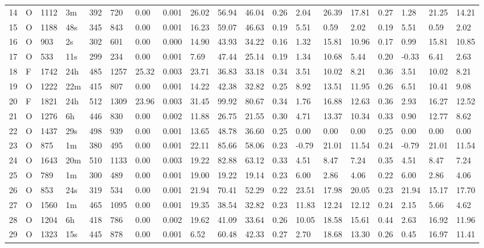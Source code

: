 \begin{tabular}{rllllllrlllllllllll}
14 & O & 1112 & 3m & 392 & 720 & 0.00 & 0.001 & 26.02 & 56.94 & 46.04 & 0.26 & 2.04 & 26.39 & 17.81 & 0.27 & 1.28 & 21.25 & 14.21 \\
15 & O & 1188 & 48s & 345 & 843 & 0.00 & 0.001 & 16.23 & 59.07 & 46.63 & 0.19 & 5.51 & 0.59 & 2.02 & 0.19 & 5.51 & 0.59 & 2.02 \\
16 & O & 903 & 2s & 302 & 601 & 0.00 & 0.000 & 14.90 & 43.93 & 34.22 & 0.16 & 1.32 & 15.81 & 10.96 & 0.17 & 0.99 & 15.81 & 10.85 \\
17 & O & 533 & 11s & 299 & 234 & 0.00 & 0.001 & 7.69 & 47.44 & 25.14 & 0.19 & 1.34 & 10.68 & 5.44 & 0.20 & -0.33 & 6.41 & 2.63 \\
18 & F & 1742 & 24h & 485 & 1257 & 25.32 & 0.003 & 23.71 & 36.83 & 33.18 & 0.34 & 3.51 & 10.02 & 8.21 & 0.36 & 3.51 & 10.02 & 8.21 \\
19 & O & 1222 & 22m & 415 & 807 & 0.00 & 0.001 & 14.22 & 42.38 & 32.82 & 0.25 & 8.92 & 13.51 & 11.95 & 0.26 & 6.51 & 10.41 & 9.08 \\
20 & F & 1821 & 24h & 512 & 1309 & 23.96 & 0.003 & 31.45 & 99.92 & 80.67 & 0.34 & 1.76 & 16.88 & 12.63 & 0.36 & 2.93 & 16.27 & 12.52 \\
21 & O & 1276 & 6h & 446 & 830 & 0.00 & 0.002 & 11.88 & 26.75 & 21.55 & 0.30 & 4.71 & 13.37 & 10.34 & 0.33 & 0.90 & 12.77 & 8.62 \\
22 & O & 1437 & 29s & 498 & 939 & 0.00 & 0.001 & 13.65 & 48.78 & 36.60 & 0.25 & 0.00 & 0.00 & 0.00 & 0.25 & 0.00 & 0.00 & 0.00 \\
23 & O & 875 & 1m & 380 & 495 & 0.00 & 0.001 & 22.11 & 85.66 & 58.06 & 0.23 & -0.79 & 21.01 & 11.54 & 0.24 & -0.79 & 21.01 & 11.54 \\
24 & O & 1643 & 20m & 510 & 1133 & 0.00 & 0.003 & 19.22 & 82.88 & 63.12 & 0.33 & 4.51 & 8.47 & 7.24 & 0.35 & 4.51 & 8.47 & 7.24 \\
25 & O & 789 & 1m & 300 & 489 & 0.00 & 0.001 & 19.00 & 19.22 & 19.14 & 0.23 & 6.00 & 2.86 & 4.06 & 0.22 & 6.00 & 2.86 & 4.06 \\
26 & O & 853 & 24s & 319 & 534 & 0.00 & 0.001 & 21.94 & 70.41 & 52.29 & 0.22 & 23.51 & 17.98 & 20.05 & 0.23 & 21.94 & 15.17 & 17.70 \\
27 & O & 1560 & 1m & 465 & 1095 & 0.00 & 0.001 & 19.35 & 38.54 & 32.82 & 0.23 & 11.83 & 12.24 & 12.12 & 0.24 & 2.15 & 5.66 & 4.62 \\
28 & O & 1204 & 6h & 418 & 786 & 0.00 & 0.002 & 19.62 & 41.09 & 33.64 & 0.26 & 10.05 & 18.58 & 15.61 & 0.44 & 2.63 & 16.92 & 11.96 \\
29 & O & 1323 & 15s & 445 & 878 & 0.00 & 0.001 & 6.52 & 60.48 & 42.33 & 0.27 & 2.70 & 18.68 & 13.30 & 0.26 & 0.45 & 16.97 & 11.41 \\

\end{tabular}
